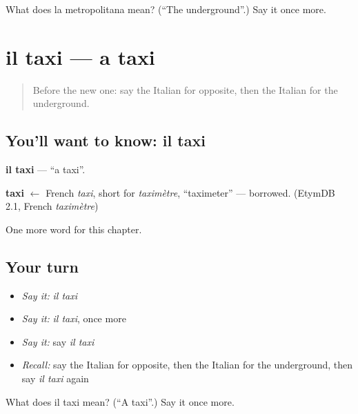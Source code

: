 \begin{tcolorbox}[breakable,colback=teal!4,colframe=teal!35!black,title={Before you move on}]
What does la metropolitana mean? (\textquotedblleft{}The underground\textquotedblright{}.) Say it once more.
\end{tcolorbox}
\section[il taxi]{il taxi — a taxi}

\label{lesson:IT-C92-taxi}



\begin{quote}
Before the new one: say the Italian for opposite, then the Italian for the underground.
\end{quote}

\subsection*{You'll want to know: il taxi}
\textbf{il taxi} — \textquotedblleft{}a taxi\textquotedblright{}.

\begin{cousinweb}
\textbf{taxi} $\leftarrow$ French \emph{taxi}, short for \emph{taximètre}, \textquotedblleft{}taximeter\textquotedblright{} — borrowed. (EtymDB 2.1, French \emph{taximètre})
\end{cousinweb}

\begin{grammarlens}[title={What you've built}]
One more word for this chapter.
\end{grammarlens}

\subsection*{Your turn}
\begin{itemize}
\raggedright
  \item \emph{Say it:} \emph{il taxi}
  \item \emph{Say it:} \emph{il taxi}, once more
  \item \emph{Say it:} say \emph{il taxi}
  \item \emph{Recall:} say the Italian for opposite, then the Italian for the underground, then say \emph{il taxi} again
\end{itemize}

\begin{tcolorbox}[breakable,colback=teal!4,colframe=teal!35!black,title={Before you move on}]
What does il taxi mean? (\textquotedblleft{}A taxi\textquotedblright{}.) Say it once more.
\end{tcolorbox}
